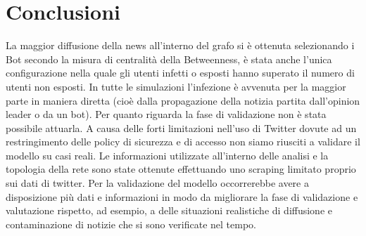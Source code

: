 \section{Conclusioni}
    La maggior diffusione della news all’interno del grafo si è ottenuta selezionando i Bot secondo la misura di centralità della Betweenness, è stata anche l’unica configurazione nella quale gli utenti infetti o esposti hanno superato il numero di utenti non esposti.\newline 
    In tutte le simulazioni l’infezione è avvenuta per la maggior parte in maniera diretta (cioè dalla propagazione della notizia partita dall’opinion leader o da un bot).
    \newline
    Per quanto riguarda la fase di validazione non è stata possibile attuarla. A causa delle forti limitazioni nell'uso di Twitter dovute ad un restringimento delle policy di sicurezza e di accesso non siamo riusciti a validare il modello su casi reali. Le informazioni utilizzate all'interno delle analisi e la topologia della rete sono state ottenute effettuando uno scraping limitato proprio sui dati di twitter. Per la validazione del modello occorrerebbe avere a disposizione più dati e informazioni in modo da migliorare la fase di validazione e valutazione rispetto, ad esempio, a delle situazioni realistiche di diffusione e contaminazione di notizie che si sono verificate nel tempo.